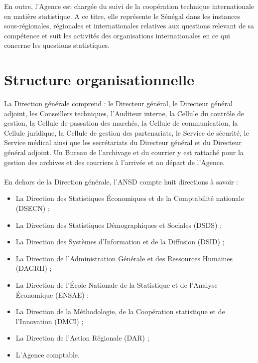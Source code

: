 En outre, l’Agence est chargée du suivi de la coopération technique internationale en matière statistique. A ce titre, elle représente le Sénégal dans les instances sous-régionales, régionales et internationales relatives aux questions relevant de sa compétence et suit les activités des organisations internationales en ce qui concerne les questions statistiques.






\section{Structure organisationnelle}

La Direction générale comprend : le Directeur général, le Directeur général adjoint, les Conseillers techniques, l’Auditeur interne, la Cellule du contrôle de gestion, la Cellule de passation des marchés, la Cellule de communication, la Cellule juridique, la Cellule de gestion des partenariats, le Service de sécurité, le Service médical 
ainsi que les secrétariats du Directeur général et du Directeur général adjoint. 
Un Bureau de l’archivage et du courrier y est rattaché pour la gestion des archives et des courriers à l’arrivée et au départ de l’Agence.\\\\
En dehors de la Direction générale, l’ANSD compte huit directions à savoir :

\begin{simplebox}
\begin{itemize}
    \item La Direction des Statistiques Économiques et de la Comptabilité nationale (DSECN) ;
    \item La Direction des Statistiques Démographiques et Sociales (DSDS) ;
    \item La Direction des Systèmes d’Information et de la Diffusion (DSID) ;
    \item La Direction de l’Administration Générale et des Ressources Humaines (DAGRH) ;
    \item La Direction de l’École Nationale de la Statistique et de l’Analyse Économique (ENSAE) ;
    \item La Direction de la Méthodologie, de la Coopération statistique et de l’Innovation (DMCI) ;
    \item La Direction de l’Action Régionale (DAR) ;
    \item L’Agence comptable.
\end{itemize}
\end{simplebox}




